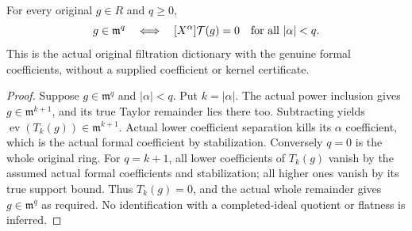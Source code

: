 \begin{theorem}
\label{hir:actual-original-formal-taylor-maximal-power-kernel}
\leanok
For every original $g\in R$ and $q\ge0$,
\[
 g\in\mathfrak m^q\quad\Longleftrightarrow\quad
 [X^\alpha]\mathcal T(g)=0\quad\hbox{for all }|\alpha|<q.
\]
This is the actual original filtration dictionary with the genuine formal
coefficients, without a supplied coefficient or kernel certificate.
\end{theorem}
\begin{proof}
Suppose $g\in\mathfrak m^q$ and $|\alpha|<q$. Put $k=|\alpha|$.
The actual power inclusion gives $g\in\mathfrak m^{k+1}$, and its true
Taylor remainder lies there too. Subtracting yields
$\operatorname{ev}(T_k(g))\in\mathfrak m^{k+1}$. Actual lower
coefficient separation kills its $\alpha$ coefficient, which is the
actual formal coefficient by stabilization. Conversely $q=0$ is the
whole original ring. For $q=k+1$, all lower coefficients of $T_k(g)$
vanish by the assumed actual formal coefficients and stabilization; all
higher ones vanish by its true support bound. Thus $T_k(g)=0$, and the
actual whole remainder gives $g\in\mathfrak m^q$ as required. No
identification with a completed-ideal quotient or flatness is inferred.
\end{proof}
